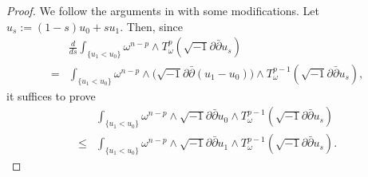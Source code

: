 \documentclass[10pt,a4paper]{amsart}
\numberwithin{equation}{section}
\newcommand{\delb}{\sqrt{-1}\partial\bar{\partial}}
\begin{document}
\begin{proof}
    We follow the arguments in \cite[Theorem 4.1]{BT} with some modifications.
    Let $u_s:=(1-s)u_0+su_1$. Then, since
    \begin{equation*}
        \begin{aligned}
            &\frac{d}{ds}\int_{\{u_1<u_0\}}\omega^{n-p}\wedge T^p_\omega(\delb u_s)\\
            =&\int_{\{u_1<u_0\}}\omega^{n-p}\wedge\big(\delb (u_1-u_0)\big)\wedge T^{p-1}_\omega(\delb u_s),
        \end{aligned}
    \end{equation*}
    it suffices to prove
    \begin{equation}\label{eq:lincomp'}
        \begin{aligned}
            &\int_{\{u_1<u_0\}}\omega^{n-p}\wedge\delb u_0\wedge T^{p-1}_\omega(\delb u_s)\\
            \le&\int_{\{u_1<u_0\}}\omega^{n-p}\wedge\delb u_1\wedge T^{p-1}_\omega(\delb u_s).
        \end{aligned}
    \end{equation}
    

\end{proof}
\end{document}
